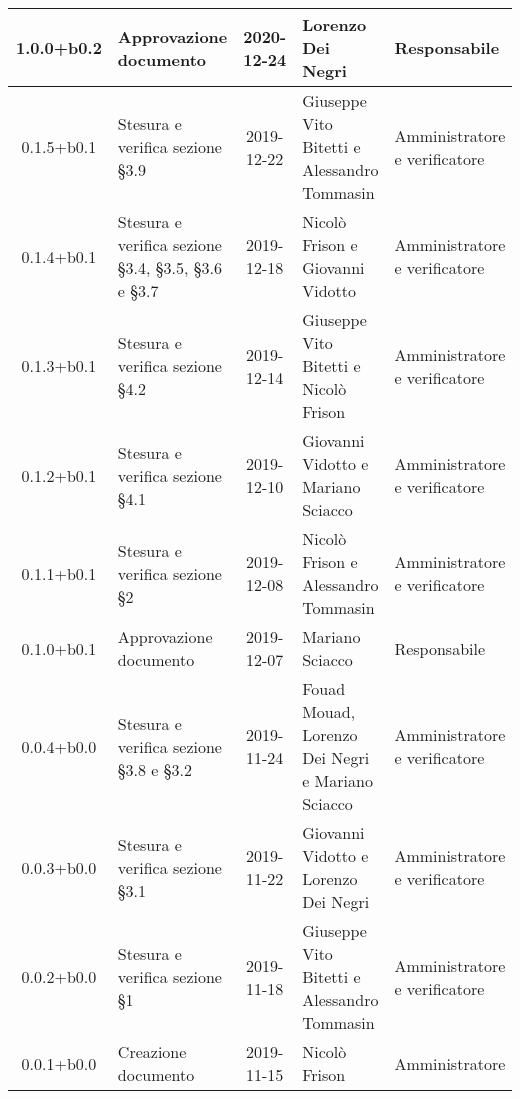\begin{center}
\begin{longtable}{|c|p{3.5cm}|c|p{3cm}|p{3cm}|}
  \hline
	1.0.0+b0.2 & Approvazione documento & 2020-12-24 & Lorenzo Dei Negri & Responsabile \\
	\hline
	0.1.5+b0.1 & Stesura e verifica sezione \S3.9 & 2019-12-22 & Giuseppe Vito Bitetti e Alessandro Tommasin  & Amministratore e verificatore \\
	\hline
	0.1.4+b0.1 & Stesura e verifica sezione \S3.4, \S3.5, \S3.6 e \S3.7 & 2019-12-18 & Nicolò Frison e Giovanni Vidotto & Amministratore e verificatore \\
	\hline
	0.1.3+b0.1 & Stesura e verifica sezione \S4.2 & 2019-12-14 & Giuseppe Vito Bitetti e Nicolò Frison & Amministratore e verificatore \\
	\hline
	0.1.2+b0.1 & Stesura e verifica sezione \S4.1 & 2019-12-10 & Giovanni Vidotto e Mariano Sciacco & Amministratore e verificatore \\
	\hline
	0.1.1+b0.1 & Stesura e verifica sezione \S2  & 2019-12-08 & Nicolò Frison e Alessandro Tommasin & Amministratore e verificatore \\
	\hline
	0.1.0+b0.1 & Approvazione documento & 2019-12-07 & Mariano Sciacco & Responsabile \\
	\hline
	0.0.4+b0.0 & Stesura e verifica sezione \S3.8 e \S3.2 & 2019-11-24 & Fouad Mouad, Lorenzo Dei Negri e Mariano Sciacco & Amministratore e verificatore \\
	\hline
	0.0.3+b0.0 & Stesura e verifica sezione \S3.1 & 2019-11-22 & Giovanni Vidotto e Lorenzo Dei Negri & Amministratore e verificatore \\
	\hline
	0.0.2+b0.0 & Stesura e verifica sezione \S1 & 2019-11-18 & Giuseppe Vito Bitetti e Alessandro Tommasin & Amministratore e verificatore \\
	\hline
	0.0.1+b0.0 & Creazione documento & 2019-11-15 & Nicolò Frison & Amministratore  \\
	\hline

	\end{longtable}
\end{center}
